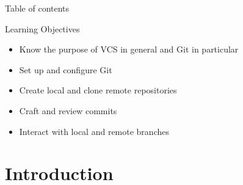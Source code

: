 \documentclass[compress,aspectratio=169]{beamer}
\title{\Large \mytitle}
\date{\mydate}
\subtitle{\mysubtitle}
\author{{\myauthor}}
\institute{\myinstitute}
\begin{document}
\begin{frame}[plain]
	\titlepage
\end{frame}

\begin{frame}[t]{Table of contents}
  \tableofcontents[subsectionstyle=hide/hide]
\end{frame}


\begin{frame}{Learning Objectives}
  \begin{itemize}
    \item Know the purpose of VCS in general and Git in particular
    \item Set up and configure Git
    \item Create local and clone remote repositories
    \item Craft and review commits
    \item Interact with local and remote branches
  \end{itemize}
\end{frame}

\section{Introduction}
\end{document}
